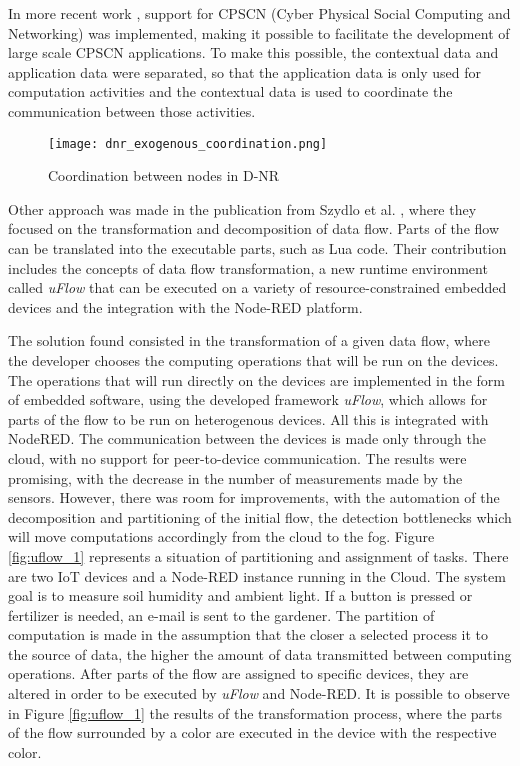 \par In more recent work \cite{exogenous_coordination}, support for CPSCN (Cyber Physical Social Computing and Networking) was implemented, making it possible to facilitate the development of large scale CPSCN applications. To make this possible, the contextual data and application data were separated, so that the application data is only used for computation activities and the contextual data is used to coordinate the communication between those activities.

\begin{figure}[h]
\caption{Coordination between nodes in D-NR \cite{fog_at_the_edge}}
\label{fig:coordination_dnr}
\centering
\texttt{[image: dnr\_exogenous\_coordination.png]}
\end{figure}

\par Other approach was made in the publication from Szydlo et al. \cite{flow_based_programming_fog}, where they focused on the transformation and decomposition of data flow. Parts of the flow can be translated into the executable parts, such as Lua code. Their contribution includes the concepts of data flow transformation, a new runtime environment called \textit{uFlow} that can be executed on a variety of resource-constrained embedded devices and the integration with the Node-RED platform. 
\par The solution found consisted in the transformation of a given data flow, where the developer chooses the computing operations that will be run on the devices. The operations that will run directly on the devices are implemented in the form of embedded software, using the developed framework \textit{uFlow}, which allows for parts of the flow to be run on heterogenous devices. All this is integrated with NodeRED. The communication between the devices is made only through the cloud, with no support for peer-to-device communication. The results were promising, with the decrease in the number of measurements made by the sensors. However, there was room for improvements, with the automation of the decomposition and partitioning of the initial flow, the detection bottlenecks which will move computations accordingly from the cloud to the fog. Figure \ref{fig:uflow_1} represents a situation of partitioning and assignment of tasks. There are two IoT devices and a Node-RED instance running in the Cloud. The system goal is to measure soil humidity and ambient light. If a button is pressed or fertilizer is needed, an e-mail is sent to the gardener. The partition of computation is made in the assumption that the closer a selected process it to the source of data, the higher the amount of data transmitted between computing operations. After parts of the flow are assigned to specific devices, they are altered in order to be executed by \textit{uFlow} and Node-RED. It is possible to observe in Figure \ref{fig:uflow_1} the results of the transformation process, where the parts of the flow surrounded by a color are executed in the device with the respective color.

